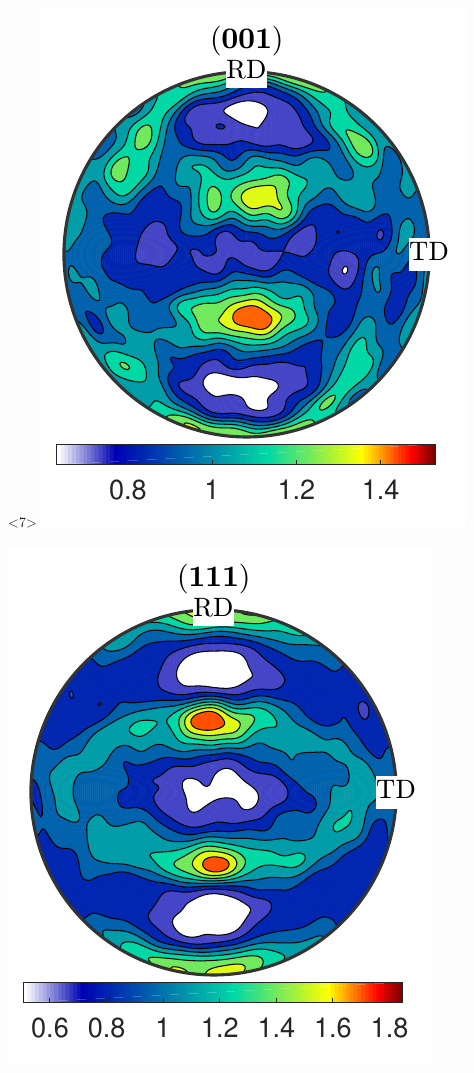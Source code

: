 \documentclass[compress]{beamer}
\begin{document}
\begin{frame}[fragile]
\begin{columns}
\begin{column}{0.29\textwidth}
            \begin{onlyenv}<7>
        \includegraphics[width=\textwidth]{pic/rolling001_4}

      \includegraphics[width=\textwidth]{pic/rolling111_4}
    \end{onlyenv}


\end{column}
\end{columns}
\end{frame}
\end{document}
